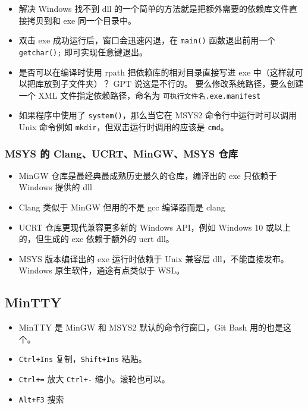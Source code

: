 \begin{itemize}
\item 解决 Windows 找不到 dll 的一个简单的方法就是把额外需要的依赖库文件直接拷贝到和 exe 同一个目录中。
\item 双击 exe 成功运行后，窗口会迅速闪退，在 \verb`main()` 函数退出前用一个 \verb`getchar();` 即可实现任意键退出。
\item 是否可以在编译时使用 rpath 把依赖库的相对目录直接写进 exe 中（这样就可以把库放到子文件夹）？ GPT 说这是不行的。 要么修改系统路径，要么创建一个 XML 文件指定依赖路径，命名为 \verb`可执行文件名.exe.manifest`
\item 如果程序中使用了 \verb`system()`，那么当它在 MSYS2 命令行中运行时可以调用 Unix 命令例如 \verb`mkdir`，但双击运行时调用的应该是 \verb`cmd`。
\end{itemize}

\subsubsection{MSYS 的 Clang、UCRT、MinGW、MSYS 仓库}
\begin{itemize}
\item MinGW 仓库是最经典最成熟历史最久的仓库，编译出的 exe 只依赖于 Windows 提供的 dll
\item Clang 类似于 MinGW 但用的不是 gcc 编译器而是 clang
\item UCRT 仓库更现代兼容更多新的 Windows API，例如 Windows 10 或以上的，但生成的 exe 依赖于额外的 ucrt dll。
\item MSYS 版本编译出的 exe 运行时依赖于 Unix 兼容层 dll，不能直接发布。 Windows 原生软件，通途有点类似于 WSL。
\end{itemize}

\subsection{MinTTY}
\begin{itemize}
\item MinTTY 是 MinGW 和 MSYS2 默认的命令行窗口，Git Bash 用的也是这个。
\item \verb`Ctrl+Ins` 复制，\verb`Shift+Ins` 粘贴。
\item \verb`Ctrl+=` 放大 \verb`Ctrl+-` 缩小。滚轮也可以。
\item \verb`Alt+F3` 搜索
\end{itemize}
